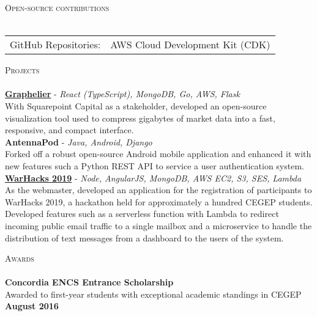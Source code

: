 \documentclass[a4paper]{article}
\newcommand{\lineunder} {
    \vspace*{-8pt} \\
    \hspace*{-18pt} \hrulefill \\
}
\newcommand{\header} [1] {
    {\hspace*{-18pt}\vspace*{6pt} \textsc{#1}}
    \vspace*{-6pt} \lineunder
}
\begin{document}
\header{Open-source contributions}
\vspace*{2mm}
\begin{tabular}{ l l }
    GitHub Repositories:        & AWS Cloud Development Kit (CDK)                            \\
\end{tabular}
\vspace{3mm}

\header{Projects}
\vspace*{2mm}
{\href{https://github.com/Lercerss/graphelier}{\textbf{Graphelier}}} - {\sl React (TypeScript), MongoDB, Go, AWS, Flask} \\
\vspace*{1mm}
With Squarepoint Capital as a stakeholder, developed an open-source visualization tool used to compress gigabytes of market data into a fast, responsive, and compact interface.\\
\vspace*{4mm}
{\textbf{AntennaPod}} - {\sl Java, Android, Django} \\
\vspace*{1mm}
Forked off a robust open-source Android mobile application and enhanced it with new features such a Python REST API to service a user authentication system.\\
\vspace*{4mm}
{\href{https://github.com/FozAhm/quill}{\textbf{WarHacks 2019}}} - {\sl Node, AngularJS, MongoDB, AWS EC2, S3, SES, Lambda} \\
\vspace*{1mm}
As the webmaster, developed an application for the registration of participants to WarHacks 2019, a hackathon held for approximately a hundred CEGEP students.\\
\vspace*{1mm}
Developed features such as a serverless function with Lambda to redirect incoming public email traffic to a single mailbox and a microservice to handle the distribution of text messages from a dashboard to the users of the system.

\vspace*{3mm}

\header{Awards}
\textbf{Concordia ENCS Entrance Scholarship}\\
Awarded to first-year students with exceptional academic standings in CEGEP \hfill \textbf{August 2016}\\
\vspace*{2mm}

\ 
\end{document}
